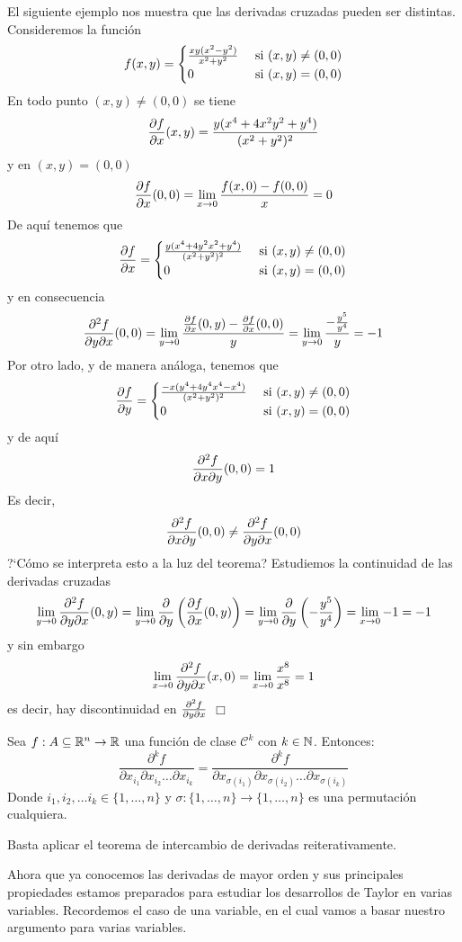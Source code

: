\begin{ejemplo} 
El siguiente ejemplo nos muestra que las derivadas cruzadas pueden ser distintas.
Consideremos la funci\'on
$$f(x,y)=\begin{cases}
\frac{xy(x^2-y^2)}{x^2+y^2} & \text{ si } (x,y)\neq (0,0)\cr 0 & \text{ si }
 (x,y)=(0,0)\end{cases}$$
En todo punto $(x,y)\neq (0,0)$ se tiene
$$\frac{\partial f}{\partial x}(x,y)=\frac{y(x^4+4x^2y^2+y^4)}{(x^2+y^2)^2}$$
y en $(x,y)=(0,0)$
$$\frac{\partial f}{\partial x}(0,0)=\lim_{x\to 0}\frac{f(x,0)-f(0,0)}{x}=0$$
De aqu\'i tenemos que 
$$\frac{\partial f}{\partial x}=
\begin{cases}
\frac{y(x^4+4y^2x^2+y^4)}{(x^2+y^2)^2}& \text{ si } 
(x,y)\neq (0,0)\cr 0& \text{ si } (x,y)=(0,0)
\end{cases}$$
y en consecuencia 
$$\frac{\partial^2 f}{\partial y\partial x}(0,0)=\lim_{y\to 0}\frac{\frac{\partial f}{\partial x}(0,y)-\frac{\partial f}{\partial x}(0,0)}{y}=\lim_{y\to 0}\frac{-\frac{y^5}{y^4}}{y}=-1$$
Por otro lado, y de manera an\'aloga, tenemos que
$$\frac{\partial f}{\partial y}=\begin{cases}\frac{-x(y^4+4y^4x^4-x^4)}{(x^2+y^2)^2}& \text{ si }
 (x,y)\neq (0,0)\cr 0& \text{ si } (x,y)=(0,0)
\end{cases}$$ y de aqu\'i
$$\frac{\partial^2 f}{\partial x\partial y}(0,0)=1$$
Es decir,
$$\frac{\partial^2 f}{\partial x\partial y}(0,0)\neq\frac{\partial^2 f}{\partial y\partial x}(0,0)$$
?`C\'omo se interpreta esto a la luz del teorema?
Estudiemos la continuidad de las derivadas cruzadas
$$\lim_{y\to 0}\frac{\partial^2 f}{\partial y\partial x}(0,y)=\lim_{y\to 0}\frac{\partial}{\partial y}\left(\frac{\partial f}{\partial x}(0,y)\right)=\lim_{y\to 0}\frac{\partial}{\partial y}\left(-\frac{y^5}{y^4}\right)=\lim_{x\to 0}-1=-1
$$
y sin embargo
$$\lim_{x\to 0}\frac{\partial^2 f}{\partial y\partial x}(x,0)=\lim_{x\to 0}\frac{x^8}{x^8}=1$$
es decir, hay discontinuidad en $\frac{\partial^2 f}{\partial y\partial x}$ \: $\Box$
\end{ejemplo}

\begin{corolario} Sea $\f1$ una funci\'on de clase $\mathcal{C}^k$ con $k\in\mathbb{N}$. Entonces:
$$\frac{\partial^k f}{\partial x_{i_1}\partial x_{i_2}\ldots\partial x_{i_k}}=\frac{\partial^k f}{\partial x_{\sigma(i_1)}\partial x_{\sigma(i_2)}\ldots\partial x_{\sigma(i_k)}}$$
Donde $i_1,i_2,\ldots i_k\in\{1,\ldots,n\}$ y $\sigma
:\{1,\ldots,n\}\to\{1,\ldots,n\}$ es una permutaci\'on cualquiera.
\end{corolario}

\begin{demostracion}
Basta aplicar el teorema de intercambio de derivadas reiterativamente.
\end{demostracion}

Ahora que ya conocemos las derivadas de mayor orden y sus principales propiedades estamos preparados para estudiar los desarrollos de Taylor en varias variables.
Recordemos el caso de una variable, en el cual vamos a basar nuestro argumento
para varias variables.

